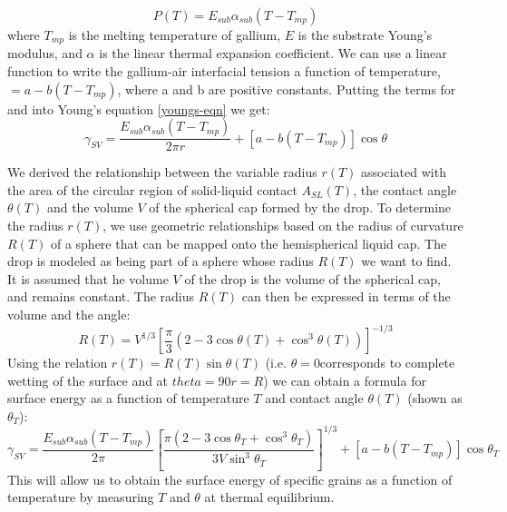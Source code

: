 \begin{equation}\label{uniform-tension}
	P(T) = E_{sub}\alpha_{sub}(T-T_{mp})
\end{equation}
where $T_{mp}$ is the melting temperature of gallium, $E$  is the substrate Young’s modulus, and $\alpha$ is the linear thermal expansion coefficient. We can use a linear function to write the gallium-air interfacial tension a function of temperature, \gamLV $= a-b(T-T_{mp})$, where a and b are positive constants.\cite{Hardy1985,Alchagirov2005} Putting the terms for \gamSL and \gamSV into Young’s equation \ref{youngs-eqn} we get\cite{Rudawska2009,Tadmor2004}:
\begin{equation*}%
	\gamma_{SV} =  \frac{E_{sub}\alpha_{sub}(T-T_{mp})}{2\pi r} + \left[a-b(T-T_{mp})\right]\cos\theta
\end{equation*}

We derived the relationship between the variable radius $r(T)$ associated with the area of the circular region of solid-liquid contact $A_{SL}(T)$, the contact angle $\theta(T)$ and the volume $V$ of the spherical cap formed by the drop. To determine the radius $r(T)$, we use geometric relationships based on the radius of curvature $R(T)$ of a sphere  that can be mapped onto the hemispherical liquid cap. The drop is modeled as being part of a sphere whose radius $R(T)$ we want to find. It is assumed that he volume $V$ of the drop is the volume of the spherical cap, and remains constant. The radius $R(T)$ can then be expressed in terms of the volume and the angle:
\begin{equation*}\label{drop-geom}
	R(T) = V^{1/3} \left[\frac{\pi}{3} \left(2-3\cos\theta(T)+\cos^{3}\theta(T)\right)\right]^{-1/3}
\end{equation*}
Using the relation $r(T)=R(T)\sin\theta(T)$ (i.e. $\theta=$0\degree corresponds to complete wetting of the surface and at $
theta=90$\degree $r=R$) we can obtain a formula for surface energy as a function of temperature $T$ and contact angle $\theta(T)$ (shown as $\theta_{T}$):
\begin{equation}\label{youngs-eqn-ga}
	\gamma_{SV} =  \frac{E_{sub}\alpha_{sub}(T-T_{mp})}{2\pi}\left[\frac{\pi\left(2-3\cos\theta_{T}+\cos^{3}\theta_{T}\right)}{3V\sin^{3}\theta_{T}} \right]^{1/3} + \left[a-b(T-T_{mp})\right]\cos\theta_{T}
\end{equation}
This will allow us to obtain the surface energy \gamSV of specific grains as a function of temperature by measuring $T$ and $\theta$ at thermal equilibrium.


